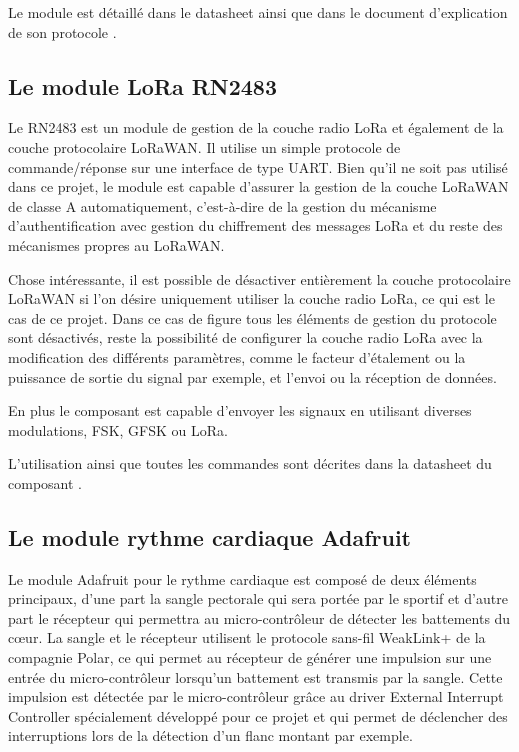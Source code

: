 Le module est détaillé dans le datasheet \cite{ublox-datasheet} ainsi que dans le document d'explication de son protocole \cite{ublox-protocol}.

\subsection{Le module LoRa RN2483}\label{ch:module_rn2483}


Le RN2483 est un module de gestion de la couche radio LoRa et également de la couche protocolaire LoRaWAN. Il utilise un simple protocole de commande/réponse sur une interface de type UART. Bien qu'il ne soit pas utilisé dans ce projet, le module est capable d'assurer la gestion de la couche LoRaWAN de classe A automatiquement, c'est-à-dire de la gestion du mécanisme d'authentification avec gestion du chiffrement des messages LoRa et du reste des mécanismes propres au LoRaWAN.

Chose intéressante, il est possible de désactiver entièrement la couche protocolaire LoRaWAN si l'on désire uniquement utiliser la couche radio LoRa, ce qui est le cas de ce projet. Dans ce cas de figure tous les éléments de gestion du protocole sont désactivés, reste la possibilité de configurer la couche radio LoRa avec la modification des différents paramètres, comme le facteur d'étalement ou la puissance de sortie du signal par exemple, et l'envoi ou la réception de données.

En plus le composant est capable d'envoyer les signaux en utilisant diverses modulations, FSK, GFSK ou LoRa.

L'utilisation ainsi que toutes les commandes sont décrites dans la datasheet du composant \cite{rn2483-datasheet}.

\subsection{Le module rythme cardiaque Adafruit}\label{ch:module_hr}

Le module Adafruit pour le rythme cardiaque est composé de deux éléments principaux, d'une part la sangle pectorale qui sera portée par le sportif et d’autre part le récepteur qui permettra au micro-contrôleur de détecter les battements du cœur. La sangle et le récepteur utilisent le protocole sans-fil WeakLink+ de la compagnie Polar, ce qui permet au récepteur de générer une impulsion sur une entrée du micro-contrôleur lorsqu'un battement est transmis par la sangle. Cette impulsion est détectée par le micro-contrôleur grâce au driver External Interrupt Controller spécialement développé pour ce projet et qui permet de déclencher des interruptions lors de la détection d'un flanc montant par exemple.

